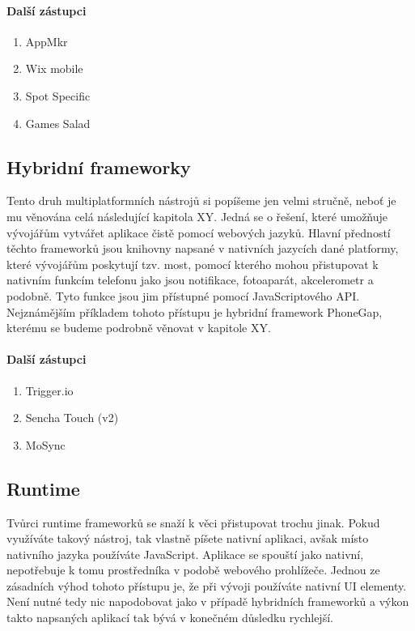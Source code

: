 \paragraph{Další zástupci}
\begin{enumerate}
	\item AppMkr
	\item Wix mobile
	\item Spot Specific
	\item Games Salad
\end{enumerate}

\subsection{Hybridní frameworky}
Tento druh multiplatformních nástrojů si popíšeme jen velmi stručně, neboť je mu věnována celá následující kapitola XY. Jedná se o řešení, které umožňuje vývojářům vytvářet aplikace čistě pomocí webových jazyků. Hlavní předností těchto frameworků jsou knihovny napsané v nativních jazycích dané platformy, které vývojářům poskytují tzv. most, pomocí kterého mohou přistupovat k nativním funkcím telefonu jako jsou notifikace, fotoaparát, akcelerometr a podobně. Tyto funkce jsou jim přístupné pomocí JavaScriptového API.
Nejznámějším příkladem tohoto přístupu je hybridní framework PhoneGap, kterému se budeme podrobně věnovat v kapitole XY.

\paragraph{Další zástupci}
\begin{enumerate}
	\item Trigger.io
	\item Sencha Touch (v2)
	\item MoSync
\end{enumerate}

\subsection{Runtime}
Tvůrci runtime frameworků se snaží k věci přistupovat trochu jinak. Pokud využíváte takový nástroj, tak vlastně píšete nativní aplikaci, avšak místo nativního jazyka používáte JavaScript. Aplikace se spouští jako nativní, nepotřebuje k tomu prostředníka v podobě webového prohlížeče. Jednou ze zásadních výhod tohoto přístupu je, že při vývoji používáte nativní UI elementy. Není nutné tedy nic napodobovat jako v případě hybridních frameworků a výkon takto napsaných aplikací tak bývá v konečném důsledku rychlejší.

